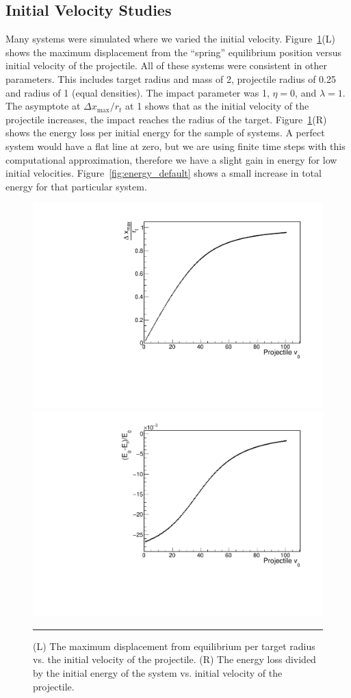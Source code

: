 \documentclass[aps,prl,floatfix,preprint,nofootinbib]{revtex4}
\begin{document}
\subsection{Initial Velocity Studies}
Many systems were simulated where we varied the initial velocity. Figure~\ref{fig:changing_pvinit1}(L) shows the maximum displacement from the ``spring'' equilibrium position versus initial velocity of the projectile. All of these systems were consistent in other parameters. This includes target radius and mass of 2, projectile radius of 0.25 and radius of 1 (equal densities). The impact parameter was 1, $\eta = 0$, and $\lambda = 1$. The asymptote at $\Delta x_{\text{max}}/r_t$ at 1 shows that as the initial velocity of the projectile increases, the impact reaches the radius of the target. Figure~\ref{fig:changing_pvinit1}(R) shows the energy loss per initial energy for the sample of systems. A perfect system would have a flat line at zero, but we are using finite time steps with this computational approximation, therefore we have a slight gain in energy for low initial velocities. Figure~\ref{fig:energy_default} shows a small increase in total energy for that particular system.
\begin{figure}[floatfix]
  \includegraphics[width=.45\linewidth]{plots/trend_plots/dxmax_vs_pvinit.pdf}
  \includegraphics[width=.45\linewidth]{plots/trend_plots/Eloss_vs_pvinit.pdf}
                  {\par\nobreak\rule[9pt]{35em}{0.5pt}\vspace{-5mm}}
                  \caption{(L) The maximum displacement from equilibrium per target radius vs. the initial velocity of the projectile. (R) The energy loss divided by the initial energy of the system vs. initial velocity of the projectile.}
                  \label{fig:changing_pvinit1}
\end{figure}
\end{document}
